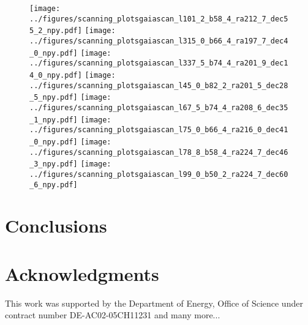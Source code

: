 \documentclass[12pt,prd]{article}
\begin{document}
\begin{figure}[h!]
\centering

\begin{comment}
\texttt{[image: ../figures/scanning\_plotsgaiascan\_l101\_2\_b58\_4\_ra212\_7\_dec55\_2\_npy\_0.pdf]}
\texttt{[image: ../figures/scanning\_plotsgaiascan\_l101\_2\_b58\_4\_ra212\_7\_dec55\_2\_npy\_1.pdf]}
\texttt{[image: ../figures/scanning\_plotsgaiascan\_l101\_2\_b58\_4\_ra212\_7\_dec55\_2\_npy\_2.pdf]}
\texttt{[image: ../figures/scanning\_plotsgaiascan\_l101\_2\_b58\_4\_ra212\_7\_dec55\_2\_npy\_3.pdf]}
\texttt{[image: ../figures/scanning\_plotsgaiascan\_l101\_2\_b58\_4\_ra212\_7\_dec55\_2\_npy\_4.pdf]}
\texttt{[image: ../figures/scanning\_plotsgaiascan\_l101\_2\_b58\_4\_ra212\_7\_dec55\_2\_npy\_5.pdf]}
\texttt{[image: ../figures/scanning\_plotsgaiascan\_l101\_2\_b58\_4\_ra212\_7\_dec55\_2\_npy\_6.pdf]}
\texttt{[image: ../figures/scanning\_plotsgaiascan\_l101\_2\_b58\_4\_ra212\_7\_dec55\_2\_npy\_7.pdf]}
\texttt{[image: ../figures/scanning\_plotsgaiascan\_l101\_2\_b58\_4\_ra212\_7\_dec55\_2\_npy\_8.pdf]}
\end{comment}



\texttt{[image: ../figures/scanning\_plotsgaiascan\_l101\_2\_b58\_4\_ra212\_7\_dec55\_2\_npy.pdf]}
\texttt{[image: ../figures/scanning\_plotsgaiascan\_l315\_0\_b66\_4\_ra197\_7\_dec4\_0\_npy.pdf]}
\texttt{[image: ../figures/scanning\_plotsgaiascan\_l337\_5\_b74\_4\_ra201\_9\_dec14\_0\_npy.pdf]}
\texttt{[image: ../figures/scanning\_plotsgaiascan\_l45\_0\_b82\_2\_ra201\_5\_dec28\_5\_npy.pdf]}
\texttt{[image: ../figures/scanning\_plotsgaiascan\_l67\_5\_b74\_4\_ra208\_6\_dec35\_1\_npy.pdf]}
\texttt{[image: ../figures/scanning\_plotsgaiascan\_l75\_0\_b66\_4\_ra216\_0\_dec41\_0\_npy.pdf]}
\texttt{[image: ../figures/scanning\_plotsgaiascan\_l78\_8\_b58\_4\_ra224\_7\_dec46\_3\_npy.pdf]}
\texttt{[image: ../figures/scanning\_plotsgaiascan\_l99\_0\_b50\_2\_ra224\_7\_dec60\_6\_npy.pdf]}
\end{figure}

\section{Conclusions} \label{sec:conclusions}


\section*{\label{sec::acknowledgments}Acknowledgments}

This work was supported by the Department of Energy, Office of Science under contract number DE-AC02-05CH11231 and many more...



\end{document}
